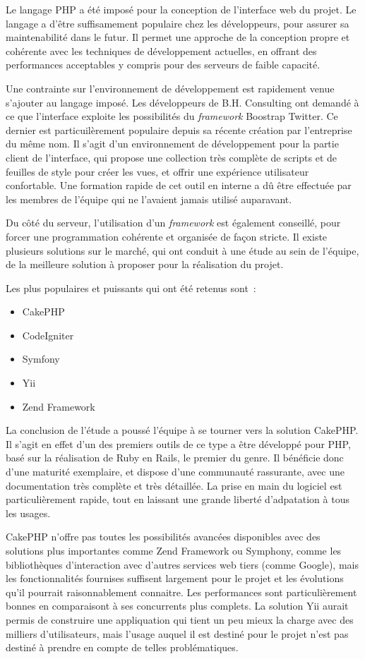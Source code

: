 Le langage PHP a été imposé pour la conception de l'interface web du projet. Le langage a d'être suffisamement populaire chez les développeurs, pour assurer sa maintenabilité dans le futur. Il permet une approche de la conception propre et cohérente avec les techniques de développement actuelles, en offrant des performances acceptables y compris pour des serveurs de faible capacité.

Une contrainte sur l'environnement de développement est rapidement venue s'ajouter au langage imposé. Les développeurs de B.H. Consulting ont demandé à ce que l'interface exploite les possibilités du \textit{framework} Boostrap Twitter. Ce dernier est particuilèrement populaire depuis sa récente création par l'entreprise du même nom. Il s'agit d'un environnement de développement pour la partie client de l'interface, qui propose une collection très complète de scripts et de feuilles de style pour créer les vues, et offrir une expérience utilisateur confortable. Une formation rapide de cet outil en interne a dû être effectuée par les membres de l'équipe qui ne l'avaient jamais utilisé auparavant.

Du côté du serveur, l'utilisation d'un \textit{framework} est également conseillé, pour forcer une programmation cohérente et organisée de façon stricte. Il existe plusieurs solutions sur le marché, qui ont conduit à une étude au sein de l'équipe, de la meilleure solution à proposer pour la réalisation du projet.

Les plus populaires et puissants qui ont été retenus sont~:

\begin{itemize}
\item CakePHP
\item CodeIgniter
\item Symfony
\item Yii
\item Zend Framework
\end{itemize}

La conclusion de l'étude a poussé l'équipe à se tourner vers la solution CakePHP. Il s'agit en effet d'un des premiers outils de ce type a être développé pour PHP, basé sur la réalisation de Ruby en Rails, le premier du genre. Il bénéficie donc d'une maturité exemplaire, et dispose d'une communauté rassurante, avec une documentation très complète et très détaillée. La prise en main du logiciel est particulièrement rapide, tout en laissant une grande liberté d'adpatation à tous les usages.

CakePHP n'offre pas toutes les possibilités avancées disponibles avec des solutions plus importantes comme Zend Framework ou Symphony, comme les bibliothèques d'interaction avec d'autres services web tiers (comme Google), mais les fonctionnalités fournises suffisent largement pour le projet et les évolutions qu'il pourrait raisonnablement connaitre. Les performances sont particulièrement bonnes en comparaisont à ses concurrents plus complets. La solution Yii aurait permis de construire une appliquation qui tient un peu mieux la charge avec des milliers d'utilisateurs, mais l'usage auquel il est destiné pour le projet n'est pas destiné à prendre en compte de telles problématiques.

